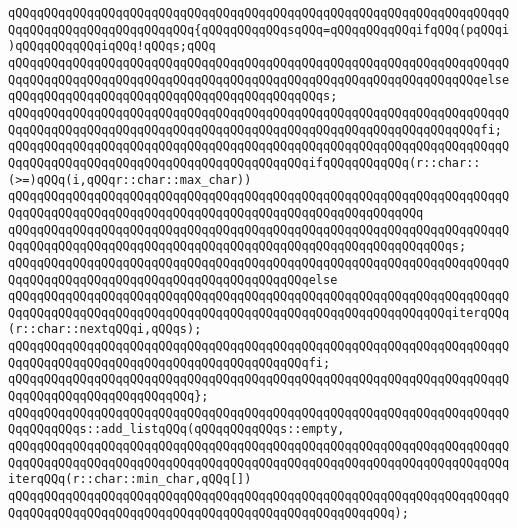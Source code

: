 \verb|qQQqqQQqqQQqqQQqqQQqqQQqqQQqqQQqqQQqqQQqqQQqqQQqqQQqqQQqqQQqqQQqqQQqqQQqqQQqqQQqqQQqqQQqqQQqqQQq{qQQqqQQqqQQqsqQQq=qQQqqQQqqQQqifqQQq(pqQQqi)qQQqqQQqqQQqiqQQq!qQQqs;qQQq|\newline
\verb|qQQqqQQqqQQqqQQqqQQqqQQqqQQqqQQqqQQqqQQqqQQqqQQqqQQqqQQqqQQqqQQqqQQqqQQqqQQqqQQqqQQqqQQqqQQqqQQqqQQqqQQqqQQqqQQqqQQqqQQqqQQqqQQqqQQqqQQqelseqQQqqQQqqQQqqQQqqQQqqQQqqQQqqQQqqQQqqQQqqQQqs;|\newline
\verb|qQQqqQQqqQQqqQQqqQQqqQQqqQQqqQQqqQQqqQQqqQQqqQQqqQQqqQQqqQQqqQQqqQQqqQQqqQQqqQQqqQQqqQQqqQQqqQQqqQQqqQQqqQQqqQQqqQQqqQQqqQQqqQQqqQQqqQQqfi;|\newline
\newline
\verb|qQQqqQQqqQQqqQQqqQQqqQQqqQQqqQQqqQQqqQQqqQQqqQQqqQQqqQQqqQQqqQQqqQQqqQQqqQQqqQQqqQQqqQQqqQQqqQQqqQQqqQQqqQQqqQQqifqQQqqQQqqQQq(r::char::(>=)qQQq(i,qQQqr::char::max_char))|\newline
\verb|qQQqqQQqqQQqqQQqqQQqqQQqqQQqqQQqqQQqqQQqqQQqqQQqqQQqqQQqqQQqqQQqqQQqqQQqqQQqqQQqqQQqqQQqqQQqqQQqqQQqqQQqqQQqqQQqqQQqqQQqqQQqqQQq|\newline
\verb|qQQqqQQqqQQqqQQqqQQqqQQqqQQqqQQqqQQqqQQqqQQqqQQqqQQqqQQqqQQqqQQqqQQqqQQqqQQqqQQqqQQqqQQqqQQqqQQqqQQqqQQqqQQqqQQqqQQqqQQqqQQqqQQqqQQqs;|\newline
\verb|qQQqqQQqqQQqqQQqqQQqqQQqqQQqqQQqqQQqqQQqqQQqqQQqqQQqqQQqqQQqqQQqqQQqqQQqqQQqqQQqqQQqqQQqqQQqqQQqqQQqqQQqqQQqqQQqelse|\newline
\verb|qQQqqQQqqQQqqQQqqQQqqQQqqQQqqQQqqQQqqQQqqQQqqQQqqQQqqQQqqQQqqQQqqQQqqQQqqQQqqQQqqQQqqQQqqQQqqQQqqQQqqQQqqQQqqQQqqQQqqQQqqQQqqQQqqQQqiterqQQq(r::char::nextqQQqi,qQQqs);|\newline
\verb|qQQqqQQqqQQqqQQqqQQqqQQqqQQqqQQqqQQqqQQqqQQqqQQqqQQqqQQqqQQqqQQqqQQqqQQqqQQqqQQqqQQqqQQqqQQqqQQqqQQqqQQqqQQqqQQqfi;|\newline
\verb|qQQqqQQqqQQqqQQqqQQqqQQqqQQqqQQqqQQqqQQqqQQqqQQqqQQqqQQqqQQqqQQqqQQqqQQqqQQqqQQqqQQqqQQqqQQqqQQq};|\newline
\newline
\verb|qQQqqQQqqQQqqQQqqQQqqQQqqQQqqQQqqQQqqQQqqQQqqQQqqQQqqQQqqQQqqQQqqQQqqQQqqQQqqQQqs::add_listqQQq(qQQqqQQqqQQqs::empty,|\newline
\verb|qQQqqQQqqQQqqQQqqQQqqQQqqQQqqQQqqQQqqQQqqQQqqQQqqQQqqQQqqQQqqQQqqQQqqQQqqQQqqQQqqQQqqQQqqQQqqQQqqQQqqQQqqQQqqQQqqQQqqQQqqQQqqQQqqQQqqQQqqQQqiterqQQq(r::char::min_char,qQQq[])|\newline
\verb|qQQqqQQqqQQqqQQqqQQqqQQqqQQqqQQqqQQqqQQqqQQqqQQqqQQqqQQqqQQqqQQqqQQqqQQqqQQqqQQqqQQqqQQqqQQqqQQqqQQqqQQqqQQqqQQqqQQqqQQqqQQq);|\newline
